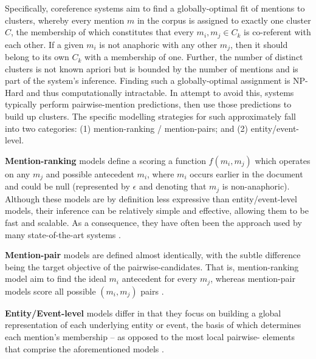 \documentclass[11pt,a4paper]{article}
\begin{document}
Specifically, coreference systems aim to find a globally-optimal fit of mentions to clusters, whereby every mention $m$ in the corpus is assigned to exactly one cluster $C$, the membership of which constitutes that every ${m_i,m_j} \in C_k$ is co-referent with each other.  If a given $m_i$ is not anaphoric with any other $m_j$, then it should belong to its own $C_k$ with a membership of one.  Further, the number of distinct clusters is not known apriori but is bounded by the number of mentions and is part of the system's inference.  Finding such a globally-optimal assignment is NP-Hard and thus computationally intractable.  In attempt to avoid this, systems typically perform pairwise-mention predictions, then use those predictions to build up clusters. The specific modelling strategies for such approximately fall into two categories: (1) mention-ranking / mention-pairs; and (2) entity/event-level.

\textbf{Mention-ranking} models define a scoring a function $f(m_i,m_j)$ which operates on any $m_j$ and possible antecedent $m_i$, where $m_i$ occurs earlier in the document and could be null (represented by $\epsilon$ and denoting that $m_j$ is non-anaphoric).  Although these models are by definition less expressive than entity/event-level models, their inference can be relatively simple and effective, allowing them to be fast and scalable.  As a consequence, they have often been the approach used by many state-of-the-art systems \cite{Soon:2001:MLA:972597.972602,DBLP:conf/emnlp/DurrettK13,DBLP:journals/corr/WisemanRS16}.

\textbf{Mention-pair} models are defined almost identically, with the subtle difference being the target objective of the pairwise-candidates.  That is, mention-ranking model aim to find the ideal $m_i$ antecedent for every $m_j$, whereas mention-pair models score all possible $(m_i,m_j)$ pairs \cite{Bengtson:2008:UVF:1613715.1613756, Soon:2001:MLA:972597.972602}.

\textbf{Entity/Event-level} models differ in that they focus on building a global representation of each underlying entity or event, the basis of which determines each mention's membership -- as opposed to the most local pairwise- elements that comprise the aforementioned models \cite{DBLP:journals/corr/WisemanRS16,clark2016improving}.
\end{document}
